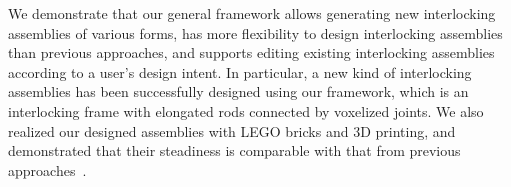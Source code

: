 %
%


We demonstrate that our general framework allows generating new interlocking assemblies of various forms, has more flexibility to design interlocking assemblies than previous approaches, and supports editing existing interlocking assemblies according to a user's design intent. 
In particular, a new kind of interlocking assemblies has been successfully designed using our framework, which is an interlocking frame with elongated rods connected by voxelized joints. 
We also realized our designed assemblies with LEGO bricks and 3D printing, and demonstrated that their steadiness is comparable with that from previous approaches~\cite{Song-2012-InterCubes, Fu-2015-Furniture}.
\fi
























